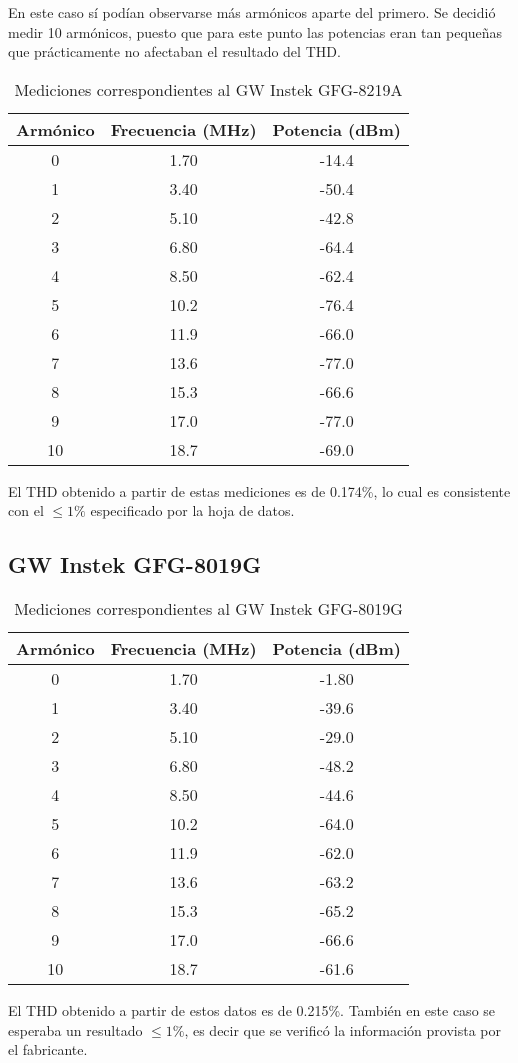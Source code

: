 \documentclass[../../labo_tp5_main.tex]{subfiles}
\begin{document}
En este caso s\'i pod\'ian observarse m\'as arm\'onicos aparte del primero. Se decidi\'o medir 10 arm\'onicos, puesto que para este punto las potencias eran tan peque\~nas que pr\'acticamente no afectaban el resultado del THD.

\begin{table}[H]
	\centering
	\begin{tabular}{|c|c|c|}
	\hline
	Arm\'onico		& Frecuencia (MHz)	& Potencia (dBm)	\\ \hline \hline 
	0			& 1.70			& -14.4			\\ \hline
	1			& 3.40			& -50.4			\\ \hline	
	2			& 5.10			& -42.8			\\ \hline
	3			& 6.80			& -64.4			\\ \hline
	4			& 8.50			& -62.4			\\ \hline
	5			& 10.2			& -76.4			\\ \hline
	6			& 11.9			& -66.0			\\ \hline
	7			& 13.6			& -77.0			\\ \hline
	8			& 15.3			& -66.6			\\ \hline
	9			& 17.0			& -77.0			\\ \hline
	10			& 18.7			& -69.0			\\ \hline
	\end{tabular}
	\caption{Mediciones correspondientes al GW Instek GFG-8219A}
\end{table}

El THD obtenido a partir de estas mediciones es de 0.174\%, lo cual es consistente con el $\leq 1\%$ especificado por la hoja de datos.


\subsection{GW Instek GFG-8019G}

\begin{table}[H]
	\centering
	\begin{tabular}{|c|c|c|}
	\hline
	Arm\'onico		& Frecuencia (MHz)	& Potencia (dBm)	\\ \hline \hline 
	0			& 1.70			& -1.80			\\ \hline
	1			& 3.40			& -39.6			\\ \hline	
	2			& 5.10			& -29.0			\\ \hline
	3			& 6.80			& -48.2			\\ \hline
	4			& 8.50			& -44.6			\\ \hline
	5			& 10.2			& -64.0			\\ \hline
	6			& 11.9			& -62.0			\\ \hline
	7			& 13.6			& -63.2			\\ \hline
	8			& 15.3			& -65.2			\\ \hline
	9			& 17.0			& -66.6			\\ \hline
	10			& 18.7			& -61.6			\\ \hline
	\end{tabular}
	\caption{Mediciones correspondientes al GW Instek GFG-8019G}
\end{table}

El THD obtenido a partir de estos datos es de 0.215\%. Tambi\'en en este caso se esperaba un resultado $\leq 1\%$, es decir que se verific\'o la informaci\'on provista por el fabricante.
\end{document}
